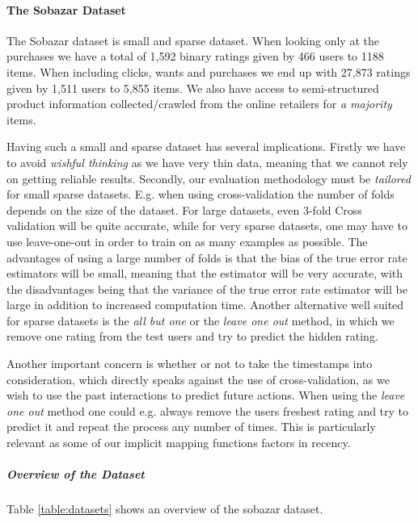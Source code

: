 \paragraph{The Sobazar Dataset}

The Sobazar dataset is small and sparse dataset. When looking only at the purchases
we have a total of 1,592 binary ratings given by 466 users to 1188 items. When including
clicks, wants and purchases we end up with 27,873 ratings given by 1,511 users to 5,855 items.
We also have access to semi-structured product information collected/crawled from
the online retailers for \emph{a majority} items.

Having such a small and sparse dataset has several implications. Firstly we have
to avoid \emph{wishful thinking} as we have very thin data, meaning that we cannot
rely on getting reliable results. Secondly, our evaluation methodology must be
\emph{tailored} for small sparse datasets. E.g. when using cross-validation the number
of folds depends on the size of the dataset. For large datasets, even 3-fold Cross
validation will be quite accurate, while for very sparse datasets, one may have to
use leave-one-out in order to train on as many examples as possible. The advantages
of using a large number of folds is that the bias of the true error rate estimators
will be small, meaning that the estimator will be very accurate, with the disadvantages being that
the variance of the true error rate estimator will be large in addition to increased
computation time. Another alternative well suited for sparse datasets is the \emph{all but one} or the
\emph{leave one out} method, in which we remove one rating from the test users
and try to predict the hidden rating.

Another important concern is whether or not to take the timestamps into consideration,
which directly speaks against the use of cross-validation, as we wish to use the past
interactions to predict future actions. When using the \emph{leave one out} method one
could e.g. always remove the users freshest rating and try to predict it and repeat the
process any number of times. This is particularly relevant as some of our implicit mapping functions
factors in recency.

\subparagraph{Overview of the Dataset}

Table \ref{table:datasets} shows an overview of the sobazar dataset.


